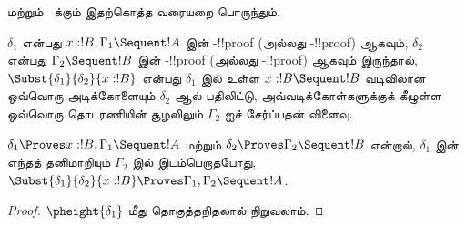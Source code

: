 \documentclass[../../../include/open-logic-section]{subfiles}
\begin{document}
 மற்றும்~ க்கும் இதற்கொத்த வரையறை பொருந்தும்.

\begin{defn}
$\delta_1$ என்பது $x:!B, \Gamma_1 \Sequent !A$ இன்
-!!{proof} (அல்லது -!!{proof}) ஆகவும்,
$\delta_2$ என்பது $\Gamma_2 \Sequent !B$ இன்
-!!{proof} (அல்லது -!!{proof}) ஆகவும் இருந்தால்,
$\Subst{\delta_1}{\delta_2}{x:!B}$ என்பது $\delta_1$ இல்
உள்ள $x:!B \Sequent !B$ வடிவிலான ஒவ்வொரு அடிக்கோளையும்
$\delta_2$ ஆல் பதிலிட்டு, அவ்வடிக்கோள்களுக்குக் கீழுள்ள
ஒவ்வொரு தொடரணியின் சூழலிலும் $\Gamma_2$ ஐச் சேர்ப்பதன் விளைவு.
\end{defn}

\begin{prop}
$\delta_1 \Proves x:!B, \Gamma_1 \Sequent
!A$ மற்றும் $\delta_2 \Proves \Gamma_2 \Sequent !B$ என்றால்,
$\delta_1$ இன் எந்தத் தனிமாறியும் $\Gamma_2$ இல்
இடம்பெறாதபோது,
$\Subst{\delta_1}{\delta_2}{x:!B} \Proves \Gamma_1, \Gamma_2 \Sequent
!A$.
\end{prop}

\begin{proof}
  $\pheight{\delta_1}$ மீது தொகுத்தறிதலால் நிறுவலாம்.
\end{proof}
\end{document}
